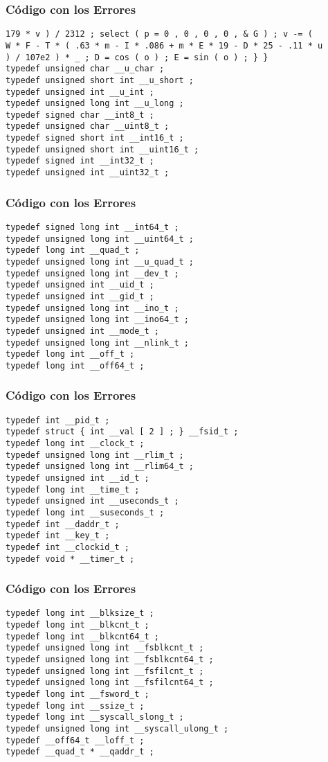 \documentclass{beamer}
\begin{document}
\begin{frame}[fragile]
\frametitle{C\'odigo con los Errores}
\begin{verbatim}
179 * v ) / 2312 ; select ( p = 0 , 0 , 0 , 0 , & G ) ; v -= ( 
W * F - T * ( .63 * m - I * .086 + m * E * 19 - D * 25 - .11 * u 
) / 107e2 ) * _ ; D = cos ( o ) ; E = sin ( o ) ; } } 
typedef unsigned char __u_char ; 
typedef unsigned short int __u_short ; 
typedef unsigned int __u_int ; 
typedef unsigned long int __u_long ; 
typedef signed char __int8_t ; 
typedef unsigned char __uint8_t ; 
typedef signed short int __int16_t ; 
typedef unsigned short int __uint16_t ; 
typedef signed int __int32_t ; 
typedef unsigned int __uint32_t ; 
\end{verbatim}
\end{frame}
\begin{frame}[fragile]
\frametitle{C\'odigo con los Errores}
\begin{verbatim}
typedef signed long int __int64_t ; 
typedef unsigned long int __uint64_t ; 
typedef long int __quad_t ; 
typedef unsigned long int __u_quad_t ; 
typedef unsigned long int __dev_t ; 
typedef unsigned int __uid_t ; 
typedef unsigned int __gid_t ; 
typedef unsigned long int __ino_t ; 
typedef unsigned long int __ino64_t ; 
typedef unsigned int __mode_t ; 
typedef unsigned long int __nlink_t ; 
typedef long int __off_t ; 
typedef long int __off64_t ; 
\end{verbatim}
\end{frame}
\begin{frame}[fragile]
\frametitle{C\'odigo con los Errores}
\begin{verbatim}
typedef int __pid_t ; 
typedef struct { int __val [ 2 ] ; } __fsid_t ; 
typedef long int __clock_t ; 
typedef unsigned long int __rlim_t ; 
typedef unsigned long int __rlim64_t ; 
typedef unsigned int __id_t ; 
typedef long int __time_t ; 
typedef unsigned int __useconds_t ; 
typedef long int __suseconds_t ; 
typedef int __daddr_t ; 
typedef int __key_t ; 
typedef int __clockid_t ; 
typedef void * __timer_t ; 
\end{verbatim}
\end{frame}
\begin{frame}[fragile]
\frametitle{C\'odigo con los Errores}
\begin{verbatim}
typedef long int __blksize_t ; 
typedef long int __blkcnt_t ; 
typedef long int __blkcnt64_t ; 
typedef unsigned long int __fsblkcnt_t ; 
typedef unsigned long int __fsblkcnt64_t ; 
typedef unsigned long int __fsfilcnt_t ; 
typedef unsigned long int __fsfilcnt64_t ; 
typedef long int __fsword_t ; 
typedef long int __ssize_t ; 
typedef long int __syscall_slong_t ; 
typedef unsigned long int __syscall_ulong_t ; 
typedef __off64_t __loff_t ; 
typedef __quad_t * __qaddr_t ; 
\end{verbatim}
\end{frame}
\end{document}
